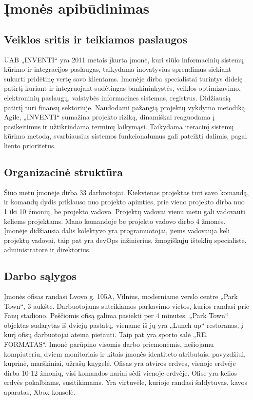 \section{Įmonės apibūdinimas}

\subsection{Veiklos sritis ir teikiamos paslaugos}
UAB „INVENTI“ yra 2011 metais įkurta įmonė, kuri siūlo informacinių sistemų kūrimo ir integracijos paslaugas,
taikydama inovatyvius sprendimus siekiant sukurti pridėtinę vertę savo klientams.
Imonėje dirba specialistai turintys didelę patirtį kuriant ir integruojant sudėtingas bankininkystės, veiklos optimizavimo, elektroninių paslaugų,
valstybės informacines sistemas, registrus. Didžiausią patirtį turi finansų sektoriuje.
Naudodami pažangią projektų vykdymo metodiką Agile, „INVENTI“ sumažina projekto riziką, dinamiškai reaguodama į pasikeitimus ir užtikrindama terminų laikymąsi.
Taikydama iteracinį sistemų kūrimo metodą, svarbiausius sistemos funkcionalumus gali pateikti dalimis, pagal liento prioritetus.


\subsection{Organizacinė struktūra}
Šiuo metu įmonėje dirba 33 darbuotojai. Kiekvienas projektas turi savo komandą,
ir komandų dydis priklauso nuo projekto apimties, prie vieno projekto dirba nuo 1 iki 10 žmonių, be projekto vadovo. Projektų vadovai vienu metu gali
vadovauti keliems projektams. Mano komandoje be projekto vadovo dirbo 4 žmonės. Įmonėje didžiausia dalis kolektyvo yra programuotojai, jiems vadovauja keli projektų vadovai,
taip pat yra devOps inžinierius, žmogiškųjų išteklių specialistė, administratorė ir direktorius.


\subsection{Darbo sąlygos}
Įmonės ofisas randasi Lvovo g. 105A, Vilnius, moderniame verslo centre „Park Town“, 3 aukšte. Darbuotojams suteikiamos parkavimo vietos, kurios randasi prie Fanų stadiono.
Peščiomis ofisą galima pasiekti per 4 minutes. „Park Town“ objektas sudarytas iš dviejų pastatų, viename iš jų yra „Lunch up“ restoranas, į kurį ofisų darbuotojai ateina pietauti.
Taip pat yra sporto salė „RE. FORMATAS“. Įmonė parūpino visomis darbo priemonėmis, nešiojamu kompiuteriu, dviem monitoriais ir kitais įmonės identiteto atributais, pavyzdžiui,
kuprinė, marškiniai, užrašų knygelė. Ofisas yra atviros erdvės, vienoje erdvėje dirba 10-12 žmonių, visi komandos nariai sėdi vienoje erdvėje.
Ofise yra kelios erdvės pokalbiams, susitikimams. Yra virtuvėle, kurioje randasi šaldytuvas, kavos aparatas, Xbox konsolė.
